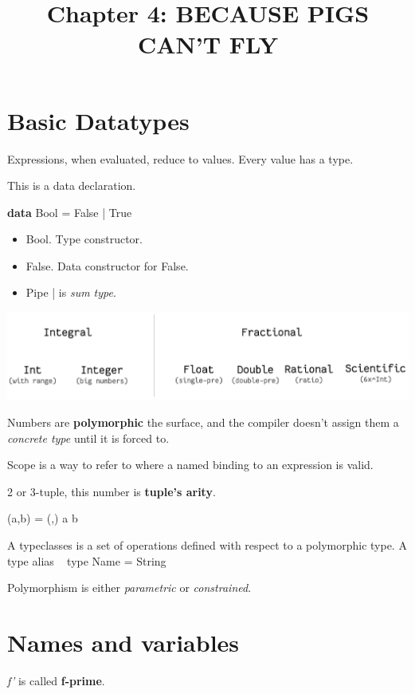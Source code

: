 \documentclass{article}
\title{Chapter 4: BECAUSE PIGS CAN'T FLY}
\date{}
\author{}
\begin{document}
   \section{Basic Datatypes}
   Expressions, when evaluated, reduce to values. Every value has a type.

   This is a data declaration.
\begin{center}
  {\selectfont \textbf{data} Bool = False | True} 
\end{center}
   \begin{itemize} \renewcommand\labelitemi{\small \textcolor{Lavender}{$\blacksquare$}}
      \item {\selectfont Bool.} Type constructor.
      \item {\selectfont False.} Data constructor for False.
      \item Pipe | is \textit{sum type}.
   \end{itemize}        

   \begin{center}
      \includegraphics[width = 11 cm]{typeclasses.png} 
   \end{center}
   

   Numbers are \textbf{polymorphic} the surface, and the compiler doesn't assign them a \textit{concrete type} until it is forced to.

   Scope is a way to refer to where a named binding to  an expression is valid.

   2 or 3-tuple, this number is \textbf{tuple's arity}.
   \begin{center}
     {\selectfont (a,b) = (,) a b } 
   \end{center}
   A typeclasses is a set of operations defined with respect to a polymorphic type.
   A type alias ~ type Name = String

   Polymorphism is either \textit{parametric} or \textit{constrained}.

   \section{Names and variables}
   \textit{f'} is called \textbf{f-prime}.
\end{document}

